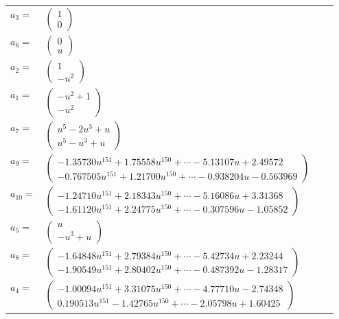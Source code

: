 \documentclass[1p]{elsarticle_modified}
\theoremstyle{definition}
\begin{document}
\begin{tabular}{m{7pt} m{180pt} m{7pt} m{180pt} }
\flushright $a_{3}=$&$\begin{pmatrix}1\\0\end{pmatrix}$ \\
\flushright $a_{6}=$&$\begin{pmatrix}0\\u\end{pmatrix}$ \\
\flushright $a_{2}=$&$\begin{pmatrix}1\\- u^2\end{pmatrix}$ \\
\flushright $a_{1}=$&$\begin{pmatrix}- u^2+1\\- u^2\end{pmatrix}$ \\
\flushright $a_{7}=$&$\begin{pmatrix}u^5-2 u^3+u\\u^5- u^3+u\end{pmatrix}$ \\
\flushright $a_{9}=$&$\begin{pmatrix}-1.35730 u^{151}+1.75558 u^{150}+\cdots-5.13107 u+2.49572\\-0.767505 u^{151}+1.21700 u^{150}+\cdots-0.938204 u-0.563969\end{pmatrix}$ \\
\flushright $a_{10}=$&$\begin{pmatrix}-1.24710 u^{151}+2.18343 u^{150}+\cdots-5.16086 u+3.31368\\-1.61120 u^{151}+2.24775 u^{150}+\cdots-0.307596 u-1.05852\end{pmatrix}$ \\
\flushright $a_{5}=$&$\begin{pmatrix}u\\- u^3+u\end{pmatrix}$ \\
\flushright $a_{8}=$&$\begin{pmatrix}-1.64848 u^{151}+2.79384 u^{150}+\cdots-5.42734 u+2.23244\\-1.90549 u^{151}+2.80402 u^{150}+\cdots-0.487392 u-1.28317\end{pmatrix}$ \\
\flushright $a_{4}=$&$\begin{pmatrix}-1.00094 u^{151}+3.31075 u^{150}+\cdots-4.77710 u-2.74348\\0.190513 u^{151}-1.42765 u^{150}+\cdots-2.05798 u+1.60425\end{pmatrix}$ \\

\end{tabular}
\end{document}
